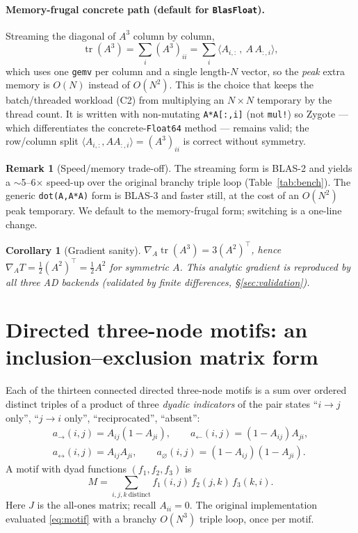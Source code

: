 \documentclass[11pt]{article}
\theoremstyle{plain}
\newtheorem{corollary}{Corollary}
\theoremstyle{definition}
\newtheorem{remark}{Remark}
\newcommand{\tr}{\operatorname{tr}}
\begin{document}
\paragraph{Memory-frugal concrete path (default for \texttt{BlasFloat}).} Streaming the diagonal of $A^3$
column by column,
\[
\tr(A^3)=\sum_i (A^3)_{ii}=\sum_i \big\langle A_{i,:}\,,\ A\,A_{:,i}\big\rangle ,
\]
which uses one \texttt{gemv} per column and a single length-$N$ vector, so the \emph{peak} extra memory is
$O(N)$ instead of $O(N^2)$. This is the choice that keeps the batch/threaded workload (C2) from multiplying
an $N\times N$ temporary by the thread count. It is written with non-mutating \texttt{A*A[:,i]} (not
\texttt{mul!}) so Zygote --- which differentiates the concrete-\texttt{Float64} method --- remains valid; the
row/column split $\langle A_{i,:},AA_{:,i}\rangle=(A^3)_{ii}$ is correct without symmetry.

\begin{remark}[Speed/memory trade-off]
The streaming form is BLAS-2 and yields a $\sim$5--6$\times$ speed-up over the original branchy triple loop
(Table~\ref{tab:bench}). The generic \texttt{dot(A,A*A)} form is BLAS-3 and faster still, at the cost of an
$O(N^2)$ peak temporary. We default to the memory-frugal form; switching is a one-line change.
\end{remark}

\begin{corollary}[Gradient sanity]
$\nabla_A \tr(A^3)=3(A^2)^\top$, hence $\nabla_A T=\tfrac12 (A^2)^\top=\tfrac12 A^2$ for symmetric $A$. This
analytic gradient is reproduced by all three AD backends (validated by finite differences,
\S\ref{sec:validation}).
\end{corollary}

\section{Directed three-node motifs: an inclusion--exclusion matrix form}
\label{sec:motifs}

Each of the thirteen connected directed three-node motifs is a sum over ordered distinct triples of a product
of three \emph{dyadic indicators} of the pair states ``$i\!\to\!j$ only'', ``$j\!\to\!i$ only'',
``reciprocated'', ``absent'':
\begin{gather*}
a_{\to}(i,j)=A_{ij}(1-A_{ji}),\qquad
a_{\leftarrow}(i,j)=(1-A_{ij})A_{ji},\\
a_{\leftrightarrow}(i,j)=A_{ij}A_{ji},\qquad
a_{\varnothing}(i,j)=(1-A_{ij})(1-A_{ji}).
\end{gather*}
A motif with dyad functions $(f_1,f_2,f_3)$ is
\begin{equation}\label{eq:motif}
M=\sum_{i,j,k\ \text{distinct}} f_1(i,j)\,f_2(j,k)\,f_3(k,i).
\end{equation}
Here $J$ is the all-ones matrix; recall $A_{ii}=0$.
The original implementation evaluated \eqref{eq:motif} with a branchy $O(N^3)$ triple loop, once per motif.
\end{document}
